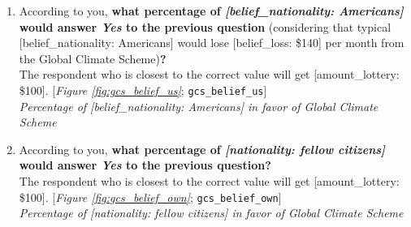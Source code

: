 \begin{enumerate}[resume]
\item  \label{q:gcs_belief_us} According to you, \textbf{what percentage of \textit{[belief\_nationality: Americans]} would answer \textit{Yes }to the previous question} (considering that typical [belief\_nationality: Americans] would lose [belief\_loss: \$140] per month from the Global Climate Scheme)\textbf{?}\\ The respondent who is closest to the correct value will get [amount\_lottery: \$100]. [\textit{Figure \ref{fig:gcs_belief_us}}; 
\verb|gcs_belief_us|]
  \\ \textit{Percentage of [belief\_nationality: Americans] in favor of Global Climate Scheme}

\item  \label{q:gcs_belief_own} According to you, \textbf{what percentage of \textit{[nationality: fellow citizens]} would answer \textit{Yes }to the previous question?}\\ The respondent who is closest to the correct value will get [amount\_lottery: \$100]. [\textit{Figure \ref{fig:gcs_belief_own}}; 
\verb|gcs_belief_own|]
  \\ \textit{Percentage of [nationality: fellow citizens] in favor of Global Climate Scheme}

\end{enumerate} 

